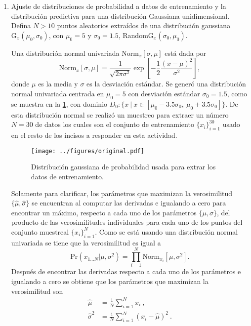 \begin{enumerate}
    \item Ajuste de distribuciones de probabilidad a datos de entrenamiento y la distribución predictiva para una distribución Gaussiana unidimensional. Defina $N > 10$ puntos aleatorios extraídos de una distribución gaussiana $\text{G}_{x}(\mu_0, \sigma_0)$, con $\mu_0 = 5$ y $\sigma_0 = 1.5$, $\text{RandomG}_{x}(\sigma_0, \mu_0)$.
    \begin{solution}
        Una distribución normal univariada $\text{Norm}_{x}[\sigma, \mu]$ está dada por
        \begin{equation}
            \text{Norm}_{x}[\sigma, \mu] = \frac{1}{\sqrt{2 \pi \sigma^2}} \exp\left[- \frac{1}{2} \frac{(x - \mu)^2}{\sigma^2}\right],
        \end{equation}
        donde $\mu$ es la media y $\sigma$ es la desviación estándar. Se generó una distribución normal univariada centrada en $\mu_0  = 5$ con desviación estándar $\sigma_0 = 1.5$, como se muestra en la \cref{fig:original}, con dominio $D_0 : \{x\ |\ x \in \left[\mu_0 - 3.5 \sigma_0,\ \mu_0 + 3.5 \sigma_0\right]\}$. De esta distribución normal se realizó un muestreo para extraer un número $N = 30$ de datos los cuales son el conjunto de entrenamiento $\{x_i\}_{i=1}^{30}$ usado en el resto de los incisos a responder en esta actividad.
        \begin{figure}[ht!]
            \centering
            \texttt{[image: ../figures/original.pdf]}
            \caption{Distribución gaussiana de probabilidad usada para extrar los datos de entrenamiento.}
            \label{fig:original}
        \end{figure}
        
        Solamente para clarificar, los parámetros que maximizan la verosimilitud $\{\hat{\mu}, \hat{\sigma}\}$ se encuentran al computar las derivadas e igualando a cero para encontrar un máximo, respecto a cada uno de los parámetros $\{\mu, \sigma\}$, del producto de las verosimilitudes individuales para cada uno de los puntos del conjunto muestreal $\{x_i\}_{i=1}^{N}$. Como se está usando una distribución normal univariada se tiene que la verosimilitud es igual a
        \begin{equation}
            \text{Pr}(x_{1 \ldots N} | \mu, \sigma^2) = \prod\limits_{i=1}^{N}\text{Norm}_{x_i} \left[\mu, \sigma^2\right].
        \end{equation}
        Después de encontrar las derivadas respecto a cada uno de los parámetros e igualando a cero se obtiene que los parámetros que maximizan la verosimilitud son
        \begin{align}
            \hat{\mu} & = \frac{1}{N} \sum\limits_{i=1}^{N} x_i\ ,\\
            \hat{\sigma}^2 & = \frac{1}{N} \sum\limits_{i=1}^{N} \left(x_i - \hat{\mu}\right)^2\ .
        \end{align}
        

\end{solution}
\end{enumerate}
